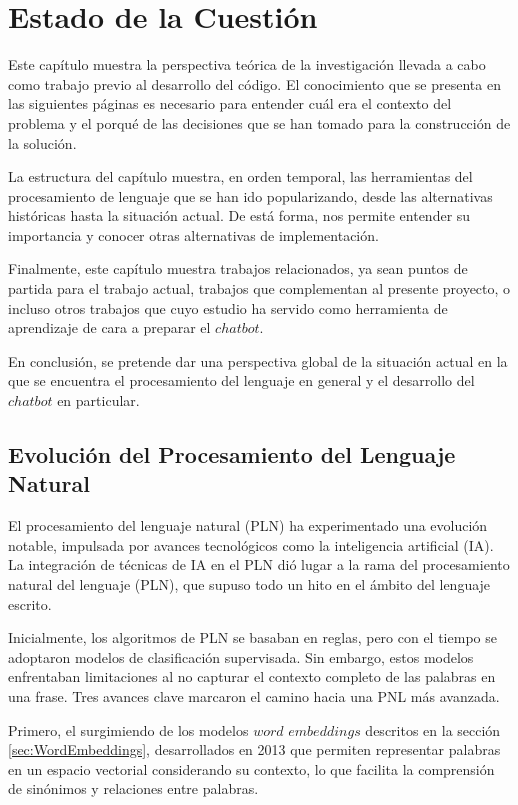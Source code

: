 \chapter{Estado de la Cuestión}
\label{cap:estadoDeLaCuestion}
Este capítulo muestra la perspectiva teórica de la investigación llevada a cabo como trabajo previo al desarrollo del código. El conocimiento que se presenta en las siguientes páginas es necesario para entender cuál era el contexto del problema y el porqué de las decisiones que se han tomado para la construcción de la solución.

La estructura del capítulo muestra, en orden temporal, las herramientas del procesamiento de lenguaje que se han ido popularizando, desde las alternativas históricas hasta la situación actual. De está forma, nos permite entender su importancia y conocer otras alternativas de implementación.

Finalmente, este capítulo muestra trabajos relacionados, ya sean puntos de partida para el trabajo actual, trabajos que complementan al presente proyecto, o incluso otros trabajos que cuyo estudio ha servido como herramienta de aprendizaje de cara a preparar el $chatbot$. 

En conclusión, se pretende dar una perspectiva global de la situación actual en la que se encuentra el procesamiento del lenguaje en general y el desarrollo del $chatbot$ en particular.  
\newpage
\section{Evolución del Procesamiento del Lenguaje Natural}
El procesamiento del lenguaje natural (PLN) ha experimentado una evolución notable, impulsada por avances tecnológicos como la inteligencia artificial (IA). La integración de técnicas de IA en el PLN dió lugar a la rama del procesamiento natural del lenguaje (PLN), que supuso todo un hito en el ámbito del lenguaje escrito.

Inicialmente, los algoritmos de PLN se basaban en reglas, pero con el tiempo se adoptaron modelos de clasificación supervisada. Sin embargo, estos modelos enfrentaban limitaciones al no capturar el contexto completo de las palabras en una frase. Tres avances clave marcaron el camino hacia una PNL más avanzada. 

Primero, el surgimiendo de los modelos $word$ $embeddings$ descritos en la sección \ref{sec:WordEmbeddings}, desarrollados en 2013 que permiten representar palabras en un espacio vectorial considerando su contexto, lo que facilita la comprensión de sinónimos y relaciones entre palabras. 

